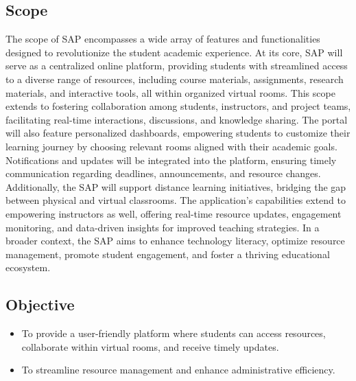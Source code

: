 \subsection{Scope}
The scope of SAP encompasses a wide array of features and functionalities designed to revolutionize the student academic experience. At its core, SAP will serve as a centralized online platform, providing students with streamlined access to a diverse range of resources, including course materials, assignments, research materials, and interactive tools, all within organized virtual rooms. This scope extends to fostering collaboration among students, instructors, and project teams, facilitating real-time interactions, discussions, and knowledge sharing. The portal will also feature personalized dashboards, empowering students to customize their learning journey by choosing relevant rooms aligned with their academic goals. Notifications and updates will be integrated into the platform, ensuring timely communication regarding deadlines, announcements, and resource changes. Additionally, the SAP will support distance learning initiatives, bridging the gap between physical and virtual classrooms. The application's capabilities extend to empowering instructors as well, offering real-time resource updates, engagement monitoring, and data-driven insights for improved teaching strategies. In a broader context, the SAP aims to enhance technology literacy, optimize resource management, promote student engagement, and foster a thriving educational ecosystem.
\newpage

\subsection{Objective}
\begin{itemize}
    \item To provide a user-friendly platform where students can access resources, collaborate within virtual rooms, and receive timely updates.
    \item To streamline resource management and enhance administrative efficiency.
\end{itemize}
\newpage